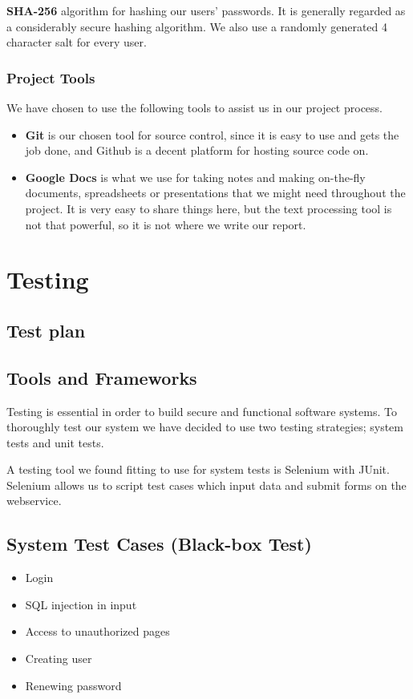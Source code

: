 \documentclass[a4paper]{article}
\begin{document}
\textbf{SHA-256} algorithm for hashing our users' passwords. It is generally regarded as a considerably secure hashing algorithm.
We also use a randomly generated 4 character salt for every user.

\subsubsection{Project Tools}
We have chosen to use the following tools to assist us in our project process.
\begin{itemize}
\item \textbf{Git} is our chosen tool for source control, since it is easy to use and gets the job done, and Github is a decent platform for hosting source code on.
\item \textbf{Google Docs} is what we use for taking notes and making on-the-fly documents, spreadsheets or presentations that we might need throughout the project. It is very easy to share things here, but the text processing tool is not that powerful, so it is not where we write our report.
\end{itemize}


\section{Testing}

\subsection{Test plan}

\subsection{Tools and Frameworks}
Testing is essential in order to build secure and functional software systems. To thoroughly test our system we have decided to use two testing strategies; system tests and unit tests.

A testing tool we found fitting to use for system tests is Selenium with JUnit. Selenium allows us to script test cases which input data and submit forms on the webservice.

\subsection{System Test Cases (Black-box Test)}

\begin{itemize}
\item Login
\item SQL injection in input
\item Access to unauthorized pages
\item Creating user
\item Renewing password
\end{itemize}
\end{document}
